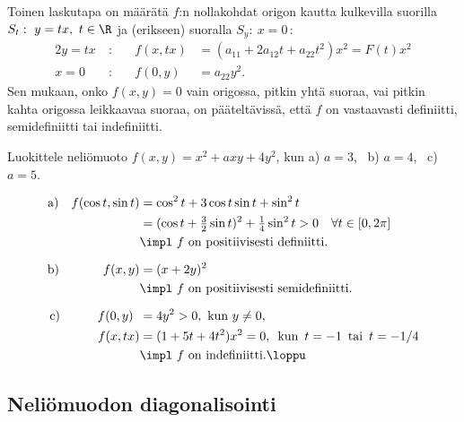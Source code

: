 Toinen laskutapa on määrätä $f$:n nollakohdat origon kautta kulkevilla suorilla
$S_t:\ y=tx,\ t\in\R$ ja (erikseen) suoralla $S_y:\ x=0\,$:
\begin{alignat*}{2}
y = tx\ &:\quad &f(x,tx)&=(a_{11}+2a_{12}t+a_{22}t^2)x^2=F(t)x^2 \\
x = 0 \ &:\quad &f(0,y) &= a_{22}y^2.
\end{alignat*}
Sen mukaan, onko $f(x,y)=0$ vain origossa, pitkin yhtä suoraa, vai pitkin kahta origossa
leikkaavaa suoraa, on pääteltävissä, että $f$ on vastaavasti definiitti, semidefiniitti tai
indefiniitti.
\begin{Exa} Luokittele neliömuoto $f(x,y)=x^2+axy+4y^2$, kun \newline
a) $a=3$, \ b) $a=4$, \ c) $a=5$.
\end{Exa}
\ratk
\begin{align*}
\text{a)}\quad f(\cos t,\sin t) 
         &= \cos^2 t + 3\cos t\sin t + \sin^2 t \\
         &= (\cos t+\tfrac{3}{2}\sin t)^2 + \tfrac{1}{4}\sin^2 t >0\quad\forall t\in [0,2\pi] \\
         &\impl \ f \text{ on positiivisesti definiitti}. \\[2mm]
\text{b)}\quad\qquad\,\  f(x,y) 
         &=(x+2y)^2 \\
         &\impl \ f \text{ on positiivisesti semidefiniitti}. \\[2mm]
\text{c)}\quad\qquad  f(0,y)\,\ 
         &= 4y^2>0,\text{ kun } y\neq 0, \\
 f(x,tx) &=(1+5t+4t^2)x^2=0,\,\ \text{kun}\,\ t=-1\,\ \text{tai}\,\ t=-1/4 \\
         &\impl \ f \text{ on indefiniitti}. \loppu
\end{align*}

\subsection*{Neliömuodon diagonalisointi}

